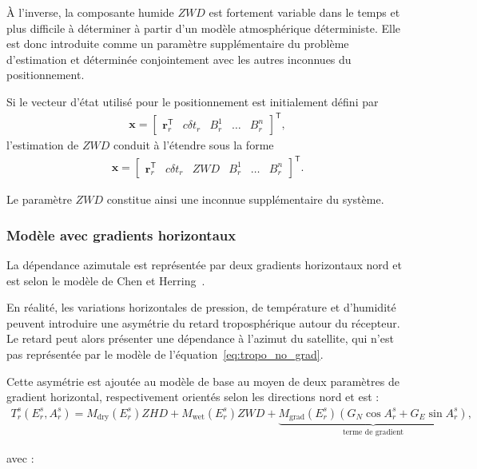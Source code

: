 À l'inverse, la composante humide $ZWD$ est fortement variable dans le temps
et plus difficile à déterminer à partir d'un modèle atmosphérique
déterministe. Elle est donc introduite comme un paramètre supplémentaire du
problème d'estimation et déterminée conjointement avec les autres inconnues
du positionnement.

Si le vecteur d'état utilisé pour le positionnement est initialement défini
par
\begin{align}
\mathbf x
=
\begin{bmatrix}
\mathbf r_r^{\mathsf T} & c\delta t_r &
B_r^1 & \ldots & B_r^n
\end{bmatrix}^{\mathsf T},
\end{align}
l'estimation de $ZWD$ conduit à l'étendre sous la forme
\begin{align}
\mathbf x
=
\begin{bmatrix}
\mathbf r_r^{\mathsf T} & c\delta t_r & ZWD &
B_r^1 & \ldots & B_r^n
\end{bmatrix}^{\mathsf T}.
\label{eq:state_zwd}
\end{align}

Le paramètre $ZWD$ constitue ainsi une inconnue supplémentaire du système.

\subsubsection{Modèle avec gradients horizontaux}

La dépendance azimutale est représentée par deux gradients horizontaux nord et
est selon le modèle de Chen et Herring~\cite{chenHerring1997}.

En réalité, les variations horizontales de pression, de température et
d'humidité peuvent introduire une asymétrie du retard troposphérique autour
du récepteur. Le retard peut alors présenter une dépendance à l'azimut du
satellite, qui n'est pas représentée par le modèle
de l'équation~\eqref{eq:tropo_no_grad}.

Cette asymétrie est ajoutée au modèle de base au moyen de deux paramètres de
gradient horizontal, respectivement orientés selon les directions nord et
est :
\begin{align}
T_r^s(E_r^s,A_r^s)
=
M_{\mathrm{dry}}(E_r^s)ZHD
+
M_{\mathrm{wet}}(E_r^s)ZWD
+
\underbrace{
M_{\mathrm{grad}}(E_r^s)
\left(
G_N\cos A_r^s + G_E\sin A_r^s
\right)
}_{\text{terme de gradient}},
\label{eq:tropo_grad}
\end{align}

avec :

